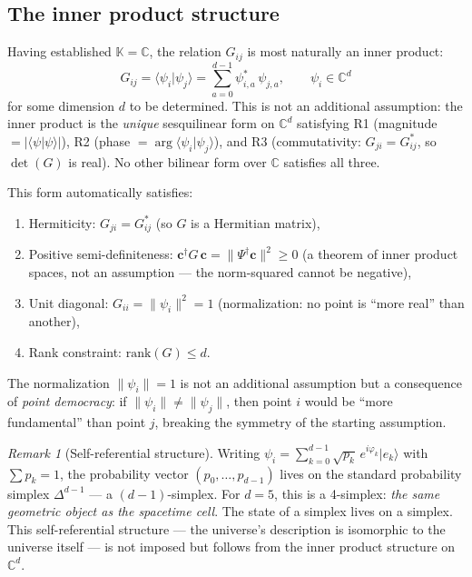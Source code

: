 \documentclass[12pt]{article}
\theoremstyle{remark}
\newtheorem{remark}[theorem]{Remark}
\theoremstyle{definition}
\begin{document}
\subsection{The inner product structure}

Having established $\mathbb{K} = \mathbb{C}$, the relation $G_{ij}$ is most naturally an inner product:
\begin{equation}
G_{ij} = \langle\psi_i|\psi_j\rangle = \sum_{a=0}^{d-1} \psi^*_{i,a}\,\psi_{j,a}, \qquad \psi_i \in \mathbb{C}^d
\end{equation}
for some dimension $d$ to be determined. This is not an additional assumption: the inner product is the \emph{unique} sesquilinear form on $\mathbb{C}^d$ satisfying R1 (magnitude $= |\langle\psi|\psi\rangle|$), R2 (phase $= \arg\langle\psi_i|\psi_j\rangle$), and R3 (commutativity: $G_{ji} = G_{ij}^*$, so $\det(G)$ is real). No other bilinear form over $\mathbb{C}$ satisfies all three.

This form automatically satisfies:
\begin{enumerate}
\item Hermiticity: $G_{ji} = G^*_{ij}$ (so $G$ is a Hermitian matrix),
\item Positive semi-definiteness: $\mathbf{c}^\dagger G\,\mathbf{c} = \|\Psi^\dagger\mathbf{c}\|^2 \geq 0$ (a theorem of inner product spaces, not an assumption --- the norm-squared cannot be negative),
\item Unit diagonal: $G_{ii} = \|\psi_i\|^2 = 1$ (normalization: no point is ``more real'' than another),
\item Rank constraint: $\text{rank}(G) \leq d$.
\end{enumerate}

The normalization $\|\psi_i\| = 1$ is not an additional assumption but a consequence of \emph{point democracy}: if $\|\psi_i\| \neq \|\psi_j\|$, then point $i$ would be ``more fundamental'' than point $j$, breaking the symmetry of the starting assumption.

\begin{remark}[Self-referential structure]
Writing $\psi_i = \sum_{k=0}^{d-1}\sqrt{p_k}\,e^{i\varphi_k}|e_k\rangle$ with $\sum p_k = 1$, the probability vector $(p_0, \ldots, p_{d-1})$ lives on the standard probability simplex $\Delta^{d-1}$ --- a $(d{-}1)$-simplex. For $d = 5$, this is a 4-simplex: \emph{the same geometric object as the spacetime cell}. The state of a simplex lives on a simplex. This self-referential structure --- the universe's description is isomorphic to the universe itself --- is not imposed but follows from the inner product structure on $\mathbb{C}^d$.
\end{remark}
\end{document}
